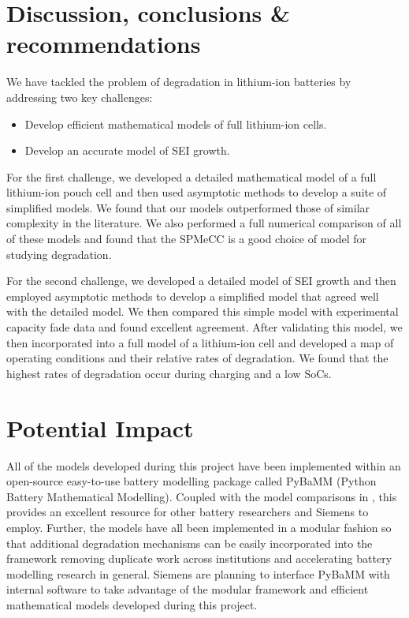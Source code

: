 \documentclass[english,a4paper,oneside,9pt]{extarticle}
\begin{document}
\newpage
\section{Discussion, conclusions \& recommendations}
We have tackled the problem of degradation in lithium-ion batteries by addressing two key challenges:
\begin{itemize}
	\item Develop efficient mathematical models of full lithium-ion cells.
	\item Develop an accurate model of SEI growth.
\end{itemize}
For the first challenge, we developed a detailed mathematical model of a full lithium-ion pouch cell and then used asymptotic methods to develop a suite of simplified models. We found that our models outperformed those of similar complexity in the literature. We also performed a full numerical comparison of all of these models and found that the SPMeCC is a good choice of model for studying degradation.

For the second challenge, we developed a detailed model of SEI growth and then employed asymptotic methods to develop a simplified model that agreed well with the detailed model. We then compared this simple model with experimental capacity fade data and found excellent agreement. After validating this model, we then incorporated into a full model of a lithium-ion cell and developed a map of operating conditions and their relative rates of degradation. We found that the highest rates of degradation occur during charging and a low SoCs.


\section{Potential Impact}
All of the models developed during this project have been implemented within an open-source easy-to-use battery modelling package called PyBaMM (Python Battery Mathematical Modelling). Coupled with the model comparisons in , this provides an excellent resource for other battery researchers and Siemens to employ. Further, the models have all been implemented in a modular fashion so that additional degradation mechanisms can be easily incorporated into the framework removing duplicate work across institutions and accelerating battery modelling research in general. Siemens are planning to interface PyBaMM with internal software to take advantage of the modular framework and efficient mathematical models developed during this project.
\end{document}
